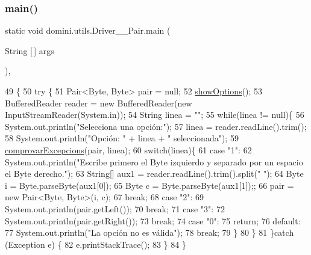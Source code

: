 \subsubsection{\texorpdfstring{main()}{main()}}
{\footnotesize\ttfamily static void domini.\+utils.\+Driver\+\_\+\+\_\+\+Pair.\+main (\begin{DoxyParamCaption}\item[{String \mbox{[}$\,$\mbox{]}}]{args }\end{DoxyParamCaption})\hspace{0.3cm}{\ttfamily [inline]}, {\ttfamily [static]}}


\begin{DoxyCode}
49                                            \{
50     \textcolor{keywordflow}{try} \{
51         Pair<Byte, Byte> pair = null;
52         \hyperlink{classdomini_1_1utils_1_1Driver____Pair_a97596378f21ba4ab9c0c4ccb4041425b}{showOptions}();
53         BufferedReader reader = \textcolor{keyword}{new} BufferedReader(\textcolor{keyword}{new} InputStreamReader(System.in));
54         String linea = \textcolor{stringliteral}{""};
55         \textcolor{keywordflow}{while}(linea != null)\{
56             System.out.println(\textcolor{stringliteral}{"Selecciona una opción:"});
57             linea = reader.readLine().trim();
58             System.out.println(\textcolor{stringliteral}{"Opción: "} + linea + \textcolor{stringliteral}{" seleccionada"});
59             \hyperlink{classdomini_1_1utils_1_1Driver____Pair_a640e07e7811e0b56a99ca1afb7e16b65}{comprovarExcepcions}(pair, linea);
60             \textcolor{keywordflow}{switch}(linea)\{
61                 \textcolor{keywordflow}{case} \textcolor{stringliteral}{"1"}:
62                     System.out.println(\textcolor{stringliteral}{"Escribe primero el Byte izquierdo y separado por un espacio el Byte
       derecho."});
63                     String[] aux1 = reader.readLine().trim().split(\textcolor{stringliteral}{" "});
64                     Byte i = Byte.parseByte(aux1[0]);
65                     Byte c = Byte.parseByte(aux1[1]);;
66                     pair = \textcolor{keyword}{new} Pair<Byte, Byte>(i, c);
67                 \textcolor{keywordflow}{break};
68                 \textcolor{keywordflow}{case} \textcolor{stringliteral}{"2"}:
69                     System.out.println(pair.getLeft());
70                 \textcolor{keywordflow}{break};
71                 \textcolor{keywordflow}{case} \textcolor{stringliteral}{"3"}:
72                 System.out.println(pair.getRight());
73                 \textcolor{keywordflow}{break};
74                 \textcolor{keywordflow}{case} \textcolor{stringliteral}{"0"}:
75                     \textcolor{keywordflow}{return};
76                 \textcolor{keywordflow}{default}:
77                     System.out.println(\textcolor{stringliteral}{"La opción no es válida"});
78                 \textcolor{keywordflow}{break};
79             \}
80         \}
81     \}\textcolor{keywordflow}{catch} (Exception e) \{
82         e.printStackTrace();
83     \}
84     \}
\end{DoxyCode}
